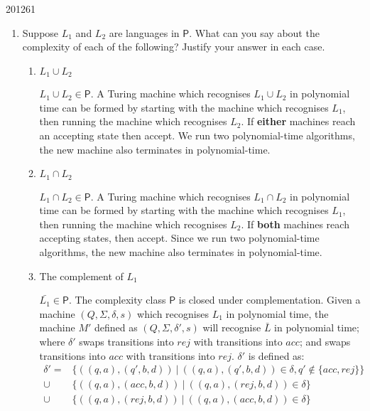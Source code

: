 \documentclass[10pt,\jkfside,a4paper]{article}
\begin{document}
\begin{examquestion}{2012}{6}{1}

\begin{enumerate}[label=(\alph*)]

\item Suppose $L_1$ and $L_2$ are languages in $\mathsf{P}$. What can you
say about the complexity of each of the following? Justify your answer in
each case.

\begin{enumerate}[label=(\roman*)]

\item $L_1 \cup L_2$

$L_1 \cup L_2 \in \mathsf{P}$. A Turing machine which recognises $L_1 \cup
L_2$ in polynomial time can be formed by starting with the machine which
recognises $L_1$, then running the machine which recognises $L_2$. If
\textbf{either} machines reach an accepting state then accept. We run two
polynomial-time algorithms, the new machine also terminates in
polynomial-time.

\item $L_1 \cap L_2$

$L_1 \cap L_2 \in \mathsf{P}$. A Turing machine which recognises $L_1 \cap
L_2$ in polynomial time can be formed by starting with the machine which
recognises $L_1$, then running the machine which recognises $L_2$. If
\textbf{both} machines reach accepting states, then accept. Since we run two
polynomial-time algorithms, the new machine also terminates in
polynomial-time.

\item The complement of $L_1$

$\bar{L_1} \in \mathsf{P}$. The complexity class $\mathsf{P}$ is closed
under complementation. Given a machine $(Q, \Sigma, \delta, s)$ which
recognises $L_1$ in polynomial time, the machine $M'$ defined as
$(Q, \Sigma, \delta', s)$ will recognise $\bar L$ in polynomial time; where
$\delta'$ swaps transitions into $rej$ with transitions into $acc$; and
swaps transitions into $acc$ with transitions into $rej$. $\delta'$ is defined
as:
\begin{align*}
\delta' = &\{((q, a), (q', b, d))\ |\ ((q, a), (q', b, d)) \in \delta, q'
\notin \{acc, rej\}\} \\
\cup &\{((q, a), (acc, b, d))\ |\ ((q, a), (rej, b, d)) \in \delta\} \\
\cup &\{((q, a), (rej, b, d))\ |\ ((q, a), (acc, b, d)) \in \delta\}
\end{align*}


\end{enumerate}
\end{enumerate}
\end{examquestion}
\end{document}
